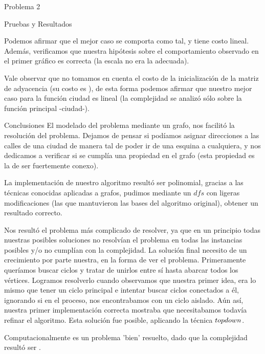 \begin{section}{Problema 2}
\begin{subsection}{Pruebas y Resultados}

		Podemos afirmar que el mejor caso se comporta como tal, y tiene costo lineal. Además, verificamos que nuestra hipótesis sobre el comportamiento observado en el primer gráfico es correcta (la escala no era la adecuada).

		Vale observar que no tomamos en cuenta el costo de la inicialización de la matriz de adyacencia (su costo es ), de esta forma podemos afirmar que nuestro mejor caso para la función ciudad es lineal (la complejidad se analizó sólo sobre la función principal -ciudad-).

	\end{subsection}

	\begin{subsection}{Conclusiones}
		El modelado del problema mediante un grafo, nos facilitó la resolución del problema. Dejamos de pensar si podíamos asignar direcciones a las calles de una ciudad de manera tal de poder ir de una esquina a cualquiera, y nos dedicamos a verificar si se cumplía una propiedad en el grafo (esta propiedad es la de ser fuertemente conexo).

		La implementación de nuestro algoritmo resultó ser polinomial, gracias a las técnicas conocidas aplicadas a grafos, pudimos mediante un $dfs$ con ligeras modificaciones (las que mantuvieron las bases del algoritmo original), obtener un resultado correcto. 

		Nos resultó el problema más complicado de resolver, ya que en un principio todas nuestras posibles soluciones no resolvían el problema en todas las instancias posibles y/o no cumplían con la complejidad. La solución final necesito de un crecimiento por parte nuestra, en la forma de ver el problema. Primeramente queríamos buscar ciclos y tratar de unirlos entre sí hasta abarcar todos los vértices. Logramos resolverlo cuando observamos que nuestra primer idea, era lo mismo que tener un ciclo principal e intentar buscar ciclos conectados a él, ignorando si en el proceso, nos encontrabamos con un ciclo aislado. Aún así, nuestra primer implementación correcta mostraba que necesitabamos todavía refinar el algoritmo. Esta solución fue posible, aplicando la técnica $top\-down$.

		Computacionalmente es un problema 'bien' resuelto, dado que la complejidad resultó ser .

	\end{subsection}
\end{section}

